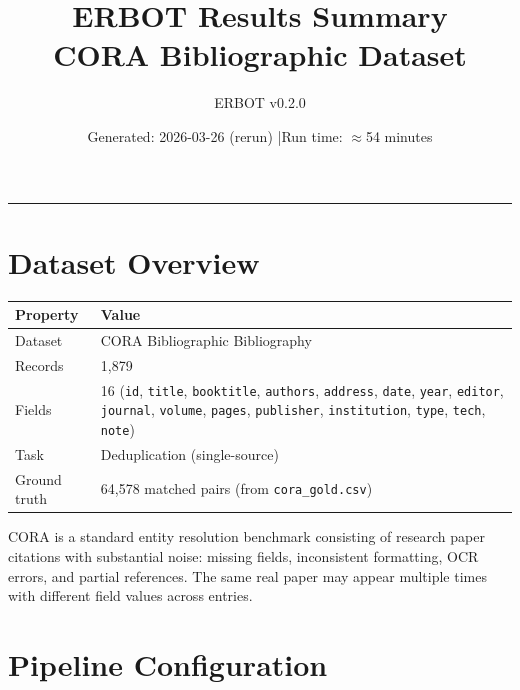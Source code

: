 \documentclass[11pt, a4paper]{article}
\title{\textbf{ERBOT Results Summary}\\[4pt]
       \large CORA Bibliographic Dataset}
\author{ERBOT v0.2.0}
\date{Generated: 2026-03-26 (rerun) \quad|\quad Run time: $\approx$54 minutes}
\begin{document}
\maketitle
\tableofcontents
\vspace{1em}
\hrule
\vspace{1em}

\section{Dataset Overview}

\begin{table}[h!]
\centering
\begin{tabular}{ll}
\toprule
\textbf{Property} & \textbf{Value} \\
\midrule
Dataset      & CORA Bibliographic Bibliography \\
Records      & 1,879 \\
Fields       & 16 (\texttt{id}, \texttt{title}, \texttt{booktitle}, \texttt{authors}, \texttt{address},
               \texttt{date}, \texttt{year}, \texttt{editor}, \texttt{journal}, \texttt{volume},
               \texttt{pages}, \texttt{publisher}, \texttt{institution}, \texttt{type}, \texttt{tech}, \texttt{note}) \\
Task         & Deduplication (single-source) \\
Ground truth & 64,578 matched pairs (from \texttt{cora\_gold.csv}) \\
\bottomrule
\end{tabular}
\end{table}

CORA is a standard entity resolution benchmark consisting of research paper citations with
substantial noise: missing fields, inconsistent formatting, OCR errors, and partial references.
The same real paper may appear multiple times with different field values across entries.

\section{Pipeline Configuration}
\end{document}
